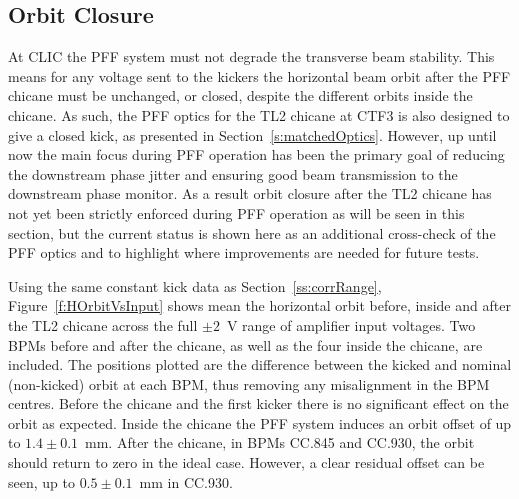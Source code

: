 \subsection{Orbit Closure}
\label{ss:orbitClosure}

At CLIC the PFF system must not degrade the transverse beam stability. This means for any voltage sent to the kickers the horizontal beam orbit after the PFF chicane must be unchanged, or closed, despite the different orbits inside the chicane. As such, the PFF optics for the TL2 chicane at CTF3 is also designed to give a closed kick, as presented in Section~\ref{s:matchedOptics}. However, up until now the main focus during PFF operation has been the primary goal of reducing the downstream phase jitter and ensuring good beam transmission to the downstream phase monitor. As a result orbit closure after the TL2 chicane has not yet been strictly enforced during PFF operation as will be seen in this section, but the current status is shown here as an additional cross-check of the PFF optics and to highlight where improvements are needed for future tests.

Using the same constant kick data as Section~\ref{ss:corrRange}, Figure~\ref{f:HOrbitVsInput} shows mean the horizontal orbit before, inside and after the TL2 chicane across the full \(\pm2\)~V range of amplifier input voltages. Two BPMs before and after the chicane, as well as the four inside the chicane, are included. The positions plotted are the difference between the kicked and nominal (non-kicked) orbit at each BPM, thus removing any misalignment in the BPM centres. Before the chicane and the first kicker there is no significant effect on the orbit as expected. Inside the chicane the PFF system induces an orbit offset of up to \(1.4\pm0.1\)~mm. After the chicane, in BPMs CC.845 and CC.930, the orbit should return to zero in the ideal case. However, a clear residual offset can be seen, up to \(0.5\pm0.1\)~mm in CC.930.

